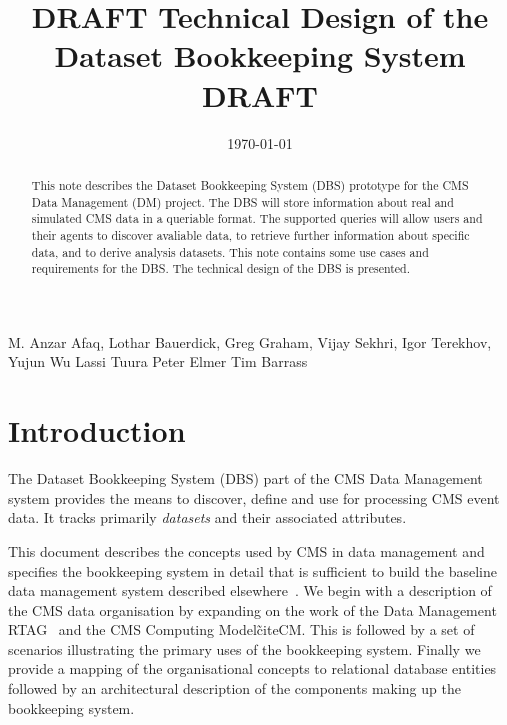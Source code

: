 \documentclass{cmspaper}
\begin{document}

\begin{titlepage}

   \date{\today}

  \title{DRAFT Technical Design of the Dataset Bookkeeping System DRAFT}


  \begin{Authlist}
    M. Anzar Afaq, Lothar Bauerdick, Greg Graham, Vijay Sekhri, Igor Terekhov, 
    Yujun Wu
    Lassi Tuura
    Peter Elmer
    Tim Barrass
  \end{Authlist}


  \begin{abstract}
      This note describes the Dataset Bookkeeping System (DBS) prototype for the 
  CMS Data Management (DM) project.  The DBS will
  store information about real and simulated CMS data in a queriable format.  The
  supported queries will allow users and their agents to discover avaliable 
  data, to retrieve further information about specific data, and to 
  derive analysis datasets. This note contains some use cases and requirements
  for the DBS.  The technical design of the DBS is presented.
    \end{abstract} 

  
\end{titlepage}

\setcounter{page}{2}%

\section{Introduction}
\label{sec:intro}

The Dataset Bookkeeping System (DBS) part of the CMS Data Management system
provides the means to discover, define and use for processing CMS event data.
It tracks primarily {\em datasets} and their associated attributes.

This document describes the concepts used by CMS in data management and
specifies the bookkeeping system in detail that is sufficient to build the
baseline data management system described elsewhere~\cite{dmman}.  We begin
with a description of the CMS data organisation by expanding on the work of
the Data Management RTAG~\cite{rtag7} and the CMS Computing Model\~cite{CM}.
This is followed by a set of scenarios illustrating the primary uses of the
bookkeeping system.  Finally we provide a mapping of the organisational
concepts to relational database entities followed by an architectural
description of the components making up the bookkeeping system.
\end{document}
